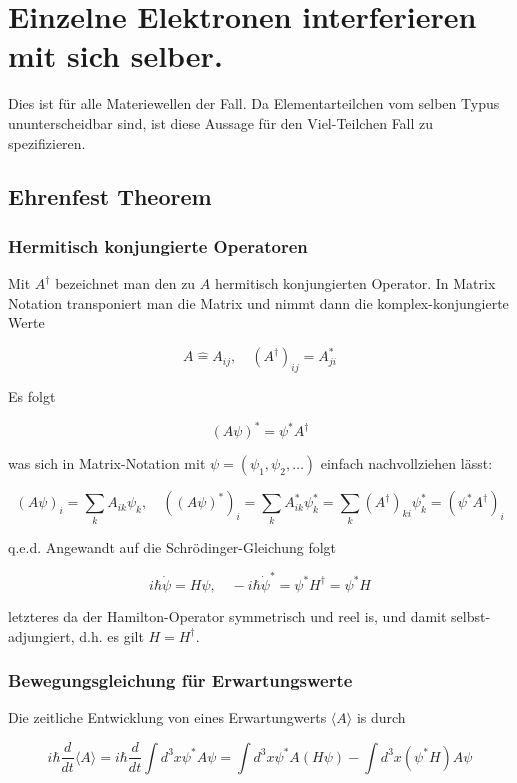\documentclass[10pt, letterpaper]{article}
\begin{document}
\section*{Einzelne Elektronen interferieren mit sich selber.}
Dies ist für alle Materiewellen der Fall. Da Elementarteilchen vom selben Typus ununterscheidbar sind, ist diese Aussage für den Viel-Teilchen Fall zu spezifizieren.

\subsection*{Ehrenfest Theorem}
\subsubsection*{Hermitisch konjungierte Operatoren}
Mit $A^{\dagger}$ bezeichnet man den zu $A$ hermitisch konjungierten Operator. In Matrix Notation transponiert man die Matrix und nimmt dann die komplex-konjungierte Werte

$$
A \hat{=} A_{i j}, \quad\left(A^{\dagger}\right)_{i j}=A_{j i}^{*}
$$

Es folgt

$$
(A \psi)^{*}=\psi^{*} A^{\dagger}
$$

was sich in Matrix-Notation mit $\psi=\left(\psi_{1}, \psi_{2}, \ldots\right)$ einfach nachvollziehen lässt:

$$
(A \psi)_{i}=\sum_{k} A_{i k} \psi_{k}, \quad\left((A \psi)^{*}\right)_{i}=\sum_{k} A_{i k}^{*} \psi_{k}^{*}=\sum_{k}\left(A^{\dagger}\right)_{k i} \psi_{k}^{*}=\left(\psi^{*} A^{\dagger}\right)_{i}
$$

q.e.d. Angewandt auf die Schrödinger-Gleichung folgt

$$
i \hbar \dot{\psi}=H \psi, \quad-i \hbar \dot{\psi}^{*}=\psi^{*} H^{\dagger}=\psi^{*} H
$$

letzteres da der Hamilton-Operator symmetrisch und reel is, und damit selbst-adjungiert, d.h. es gilt $H=H^{\dagger}$.

\subsubsection*{Bewegungsgleichung für Erwartungswerte}
Die zeitliche Entwicklung von eines Erwartungwerts $\langle A\rangle$ is durch

$$
i \hbar \frac{d}{d t}\langle A\rangle=i \hbar \frac{d}{d t} \int d^{3} x \psi^{*} A \psi=\int d^{3} x \psi^{*} A(H \psi)-\int d^{3} x\left(\psi^{*} H\right) A \psi
$$
\end{document}
